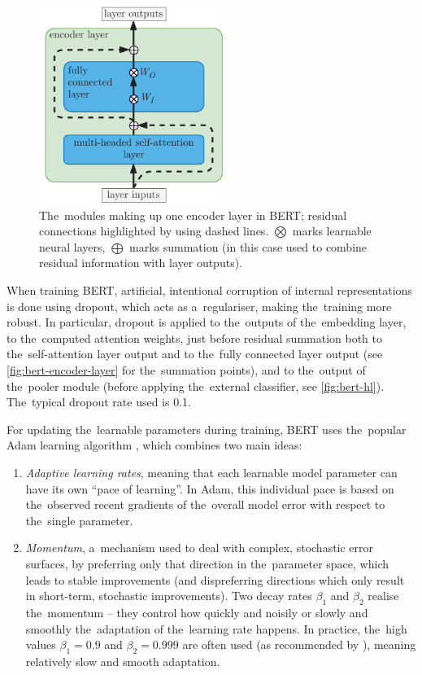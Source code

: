 \documentclass[bsc,frontabs,singlespacing,parskip,deptreport]{infthesis}
\begin{document}
{{{      \begin{figure}[h!t]
        \centering
        \includegraphics[width=6cm]{graphics/bert-encoder-layer}
        \caption{The~modules making up one encoder layer in BERT; residual connections highlighted by using dashed lines. $\bigotimes$ marks learnable neural layers, $\bigoplus$ marks summation (in this case used to combine residual information with layer outputs).}
        \label{fig:bert-encoder-layer}
      \end{figure}

      When training BERT, artificial, intentional corruption of internal representations is done using dropout, which acts as a~regulariser, making the~training more robust. In particular, dropout is applied to the~outputs of the~embedding layer, to the~computed attention weights, just before residual summation both to the~self-attention layer output and to the~fully connected layer output (see \autoref{fig:bert-encoder-layer} for the~summation points), and to the~output of the~pooler module (before applying the~external classifier, see \autoref{fig:bert-hl}). The~typical dropout rate used is 0.1.
      
      For updating the~learnable parameters during training, BERT uses the~popular Adam learning algorithm \citep{Kingma_2014}, which combines two main ideas:
      \begin{enumerate}
        \item \textit{Adaptive learning rates}, meaning that each learnable model parameter can have its own ``pace of learning''. In Adam, this individual pace is based on the~observed recent gradients of the~overall model error with respect to the~single parameter.
        \item \textit{Momentum}, a~mechanism used to deal with complex, stochastic error surfaces, by preferring only that direction in the~parameter space, which leads to stable improvements (and dispreferring directions which only result in short-term, stochastic improvements). Two decay rates $\beta_1$ and $\beta_2$ realise the~momentum -- they control how quickly and noisily or slowly and smoothly the~adaptation of the~learning rate happens. In practice, the~high values $\beta_1=0.9$ and $\beta_2=0.999$ are often used (as recommended by \citeauthor{Kingma_2014}), meaning relatively slow and smooth adaptation.
      \end{enumerate}
      
}}}
\end{document}
